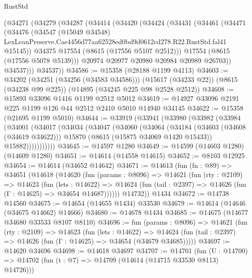 \begin{lexlean}{RustStd}
\begin{coremodule}
    (@34271
      (@34279
        (@34287
          (@34414
            (@34420
              (@34424
                (@34431
                  (@34461
                    (@34471
                      (@34476
                        (@34547
                          (@15049 @34548)
                          LexLeanPreserve.Cae4456d77aa62528ed0bd9d0612cd278.R22.RustStd.fal41
                          @15145))
                      @34375
                      @17554
                      (@8615 (@17556 @5107 @2512)))
                    @17554
                    (@8615 (@17556 @5078 @5139)))
                  @20974
                  @20977
                  @20980
                  @20984
                  @20989
                  @26703))
              @34537)))
        @34537))
@34586 := @15358 (@28188 @1199 @4113)
@34603 := @34202
    (@34251 (@34256 (@34583 @34586)))
    (@15617 (@34233 @22))
    (@8615 (@34238 @99 @225))
    (@14895 (@34245 @225 @98 @2528 @2512))
@34608 := @15893 @33096 @1416 @1199 @2512 @5012
@34619 := @14927 @33096 @2191 @225 @1199 @126 @44 @2512 @2410 @5010 @14940 @34145
@34622 := @15358 (@21695 @1199 @5010)
@34644 := @33919
    (@33941
      (@33980
        (@33982
          (@33984
            (@34001
              (@34017
                (@34034
                  (@34047
                    (@34060
                      (@34064
                        (@34184
                          (@34603 (@34608 (@34619 @34622)))
                          @15870
                          (@8615 (@15875 @34069 @1420 @15433))
                          @15882)))))))))))
@34645 := @14597 @1280
@34649 := @14599 (@14603 @1280) (@14609 @1280)
@34651 := @14614 (@14558 @14615)
@34652 := @8103 @12925
@34654 := @14614 (@34652 @14642)
@34671 := @14613
    (fun (fn : @89) =>
    @34651
      (@14618
        (@14620
          (fun (params : @8096) =>
          @14621
            (fun (rty : @2109) =>
            @14623
              (fun (lets : @14622) =>
              @14624 (fun (tail : @2397) => @14626 (fun (Γ : @14625) => @34654 @14687))))))
        @14732))
    @1434
@34672 := @14738 @14560
@34675 := @14654 (@14655 @1434) @33530
@34679 := @14614 (@14646 (@34675 @14662) @14666)
@34680 := @14678 @1434
@34685 := @14675 (@14677 @34680 @33533 @8107 @8110)
@34696 := fun (params : @8096) =>
  @14621
    (fun (rty : @2109) =>
    @14623
      (fun (lets : @14622) =>
      @14624 (fun (tail : @2397) => @14626 (fun (Γ : @14625) => @34654 (@34679 @34685)))))
@34697 := @14620 @34696
@34698 := @14618 @34697
@34707 := @14701
    (fun (U : @14700) => @14702 (fun (t : @7) => @14709 (@14614 (@14715 @33530 @8113) @14726)))

\end{coremodule}
\end{lexlean}
